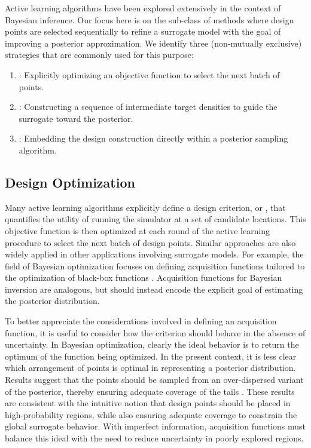 \documentclass[12pt]{article}
\begin{document}
Active learning algorithms have been explored extensively in the context of Bayesian inference. Our focus
here is on the sub-class of methods where design points are selected sequentially to refine a surrogate
model with the goal of improving a posterior approximation. We identify three (non-mutually exclusive)
strategies that are commonly used for this purpose:
\begin{enumerate}
    \item {}: Explicitly optimizing an objective function to select the next batch of points.
    \item {}: Constructing a sequence of intermediate target densities to guide the surrogate toward the posterior.
    \item {}: Embedding the design construction directly within a posterior sampling algorithm.
\end{enumerate}

\subsection{Design Optimization}
Many active learning algorithms explicitly define a design criterion, or , that quantifies the utility 
of running the simulator at a set of candidate locations. This objective function is then optimized at each round
of the active learning procedure to select the next batch of design points. Similar approaches are also widely applied in other
applications involving surrogate models. For example, the field of Bayesian optimization focuses on defining 
acquisition functions tailored to the optimization of  black-box functions \citep{reviewBayesOpt}. Acquisition functions for 
Bayesian inversion are analogous, but should instead encode the explicit goal of estimating the posterior distribution.

To better appreciate the considerations involved in defining an acquisition function, it is useful to consider how the 
criterion should behave in the absence of uncertainty. In Bayesian optimization, clearly the ideal behavior is to 
return the optimum of the function being optimized. In the present context, it is less clear which arrangement of points 
is optimal in representing a posterior distribution. Results suggest that the points should be sampled from an 
over-dispersed variant of the posterior, thereby ensuring adequate coverage of the tails \citep{StuartTeck2,briol2017sampling}. 
These results are consistent with the intuitive notion that design points should be placed in high-probability regions, while also 
ensuring adequate coverage to constrain the global surrogate behavior. With imperfect information, acquisition functions must 
balance this ideal with the need to reduce uncertainty in poorly explored regions.
\end{document}
